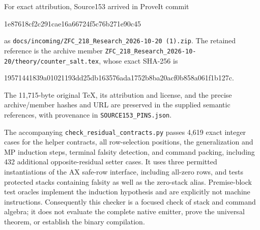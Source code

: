 For exact attribution, Source153 arrived in ProveIt commit
\begin{center}\footnotesize\ttfamily
1e87618cf2c291cae16a66724f5c76b271e90c45
\end{center}
as \nolinkurl{docs/incoming/ZFC_218_Research_2026-10-20 (1).zip}.
The retained reference is the archive member
\nolinkurl{ZFC_218_Research_2026-10-20/theory/counter_salt.tex},
whose exact SHA-256 is
\begin{center}\footnotesize\ttfamily
19571441839a01021193dd25db163576ada1752b8ba20acf0b858a061f1b127c.
\end{center}
The 11,715-byte original TeX, its attribution and license, and the precise
archive/member hashes and URL are preserved in the supplied semantic
references, with provenance in \nolinkurl{SOURCE153_PINS.json}.

The accompanying \nolinkurl{check_residual_contracts.py} passes 4,619 exact
integer cases for the helper contracts, all row-selection positions,
the generalization and MP induction steps, terminal falsity detection, and
command packing, including 432 additional opposite-residual setter cases.
It uses three permitted instantiations of the AX
safe-row interface, including all-zero rows, and tests protected stacks
containing falsity as well as the zero-stack alias.  Premise-block test
oracles implement the induction hypothesis and are explicitly not machine
instructions.  Consequently this checker is a focused check of stack and
command algebra; it does not evaluate the complete native emitter, prove
the universal theorem, or establish the binary compilation.
